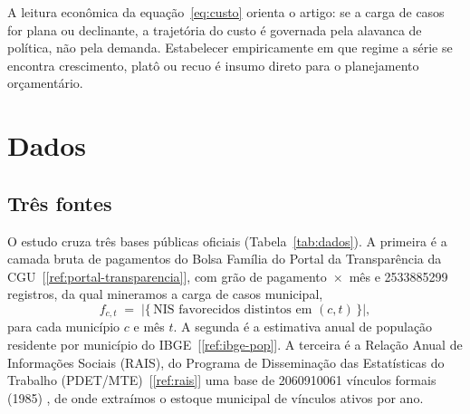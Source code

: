 \documentclass[12pt,a4paper,oneside]{article}
\newcommand{\C}[1]{[\ref{#1}]}
\begin{document}
A leitura econômica da equação~\eqref{eq:custo} orienta o artigo: se a
carga de casos for plana ou declinante, a trajetória do custo é governada
pela alavanca de política, não pela demanda. Estabelecer empiricamente em
que regime a série se encontra \textemdash{} crescimento, platô ou recuo
\textemdash{} é insumo direto para o planejamento orçamentário.

\section{Dados}
\label{sec:dados}

\subsection{Três fontes}

O estudo cruza três bases públicas oficiais (Tabela~\ref{tab:dados}). A
primeira é a camada bruta de pagamentos do Bolsa Família do Portal da
Transparência da CGU~\C{ref:portal-transparencia}, com grão de
pagamento~$\times$~mês e \num{2533885299} registros, da qual mineramos a
carga de casos municipal,
\begin{equation}
f_{c,t} \;=\; \bigl|\{\,\text{NIS favorecidos distintos em } (c,t)\,\}\bigr|,
\end{equation}
para cada município $c$ e mês $t$. A segunda é a estimativa anual de
população residente por município do IBGE~\C{ref:ibge-pop}. A terceira é a
Relação Anual de Informações Sociais (RAIS), do Programa de Disseminação
das Estatísticas do Trabalho (PDET/MTE)~\C{ref:rais} \textemdash{} uma base
de \num{2060910061} vínculos formais (1985) \textemdash{},
de onde extraímos o estoque municipal de vínculos ativos por ano.
\end{document}
